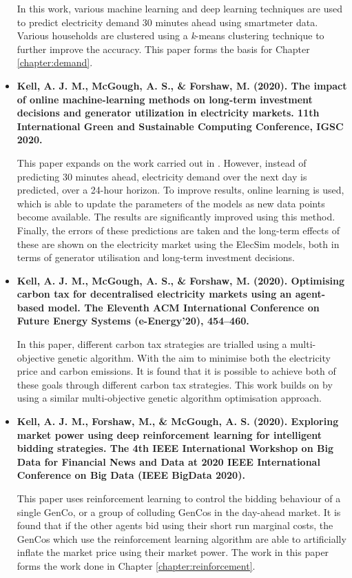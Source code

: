 \begin{itemize}
	In this work, various machine learning and deep learning techniques are used to predict electricity demand 30 minutes ahead using \gls{smartmeter} data. Various households are clustered using a \textit{k}-means clustering technique to further improve the accuracy. This paper forms the basis for Chapter \ref{chapter:demand}.
	
	\item[\textbf{\cite{Kell2020c}}] \textbf{Kell, A. J. M., McGough, A. S., \& Forshaw, M. (2020). The impact of online machine-learning methods on long-term investment decisions and generator utilization in electricity markets. 11th International Green and Sustainable Computing Conference, IGSC 2020.}
	
	This paper expands on the work carried out in \cite{Kell2018a}. However, instead of predicting 30 minutes ahead, electricity demand over the next day is predicted, over a 24-hour horizon. To improve results, online learning is used, which is able to update the parameters of the models as new data points become available. The results are significantly improved using this method. Finally, the errors of these predictions are taken and the long-term effects of these are shown on the electricity market using the ElecSim models, both in terms of generator utilisation and long-term investment decisions.

	
	\item[\textbf{\cite{Kell2020a}}] \textbf{Kell, A. J. M., McGough, A. S., \& Forshaw, M. (2020). Optimising carbon tax for decentralised electricity markets using an agent-based model. The Eleventh ACM International Conference on Future Energy Systems (e-Energy’20), 454–460.}
	
	In this paper, different carbon tax strategies are trialled using a multi-objective genetic algorithm. With the aim to minimise both the electricity price and carbon emissions. It is found that it is possible to achieve both of these goals through different carbon tax strategies. This work builds on \cite{Kell2019} by using a similar multi-objective genetic algorithm optimisation approach. 
	
		\item[\textbf{\cite{Kell2020d}}] \textbf{Kell, A. J. M., Forshaw, M., \& McGough, A. S. (2020). Exploring market power using deep reinforcement learning for intelligent bidding strategies. The 4th IEEE International Workshop on Big Data for Financial News and Data at 2020 IEEE International Conference on Big Data (IEEE BigData 2020).}
	
		This paper uses reinforcement learning to control the bidding behaviour of a single GenCo, or a group of colluding GenCos in the day-ahead market. It is found that if the other agents bid using their short run marginal costs, the GenCos which use the reinforcement learning algorithm are able to artificially inflate the market price using their market power. The work in this paper forms the work done in Chapter \ref{chapter:reinforcement}.
\end{itemize}


